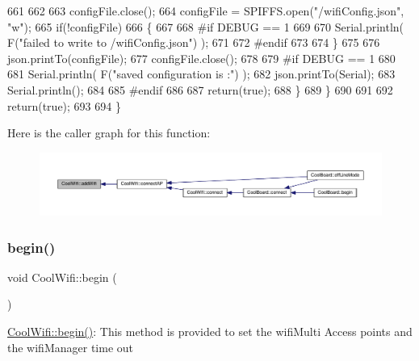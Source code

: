 \begin{DoxyCode}
661             
662 
663             configFile.close();
664             configFile = SPIFFS.open(\textcolor{stringliteral}{"/wifiConfig.json"}, \textcolor{stringliteral}{"w"});
665             \textcolor{keywordflow}{if}(!configFile)
666             \{
667             
668 \textcolor{preprocessor}{            #if DEBUG == 1 }
669 
670                 Serial.println( F(\textcolor{stringliteral}{"failed to write to /wifiConfig.json"}) );
671             
672 \textcolor{preprocessor}{            #endif}
673 
674             \}
675             
676             json.printTo(configFile);
677             configFile.close();
678 
679 \textcolor{preprocessor}{        #if DEBUG == 1 }
680 
681             Serial.println( F(\textcolor{stringliteral}{"saved configuration is :"}) );
682             json.printTo(Serial);
683             Serial.println();
684         
685 \textcolor{preprocessor}{        #endif}
686 
687             \textcolor{keywordflow}{return}(\textcolor{keyword}{true}); 
688         \}
689     \}   
690 
691     
692     \textcolor{keywordflow}{return}(\textcolor{keyword}{true});
693     
694 \}
\end{DoxyCode}
Here is the caller graph for this function\+:
\nopagebreak
\begin{figure}[H]
\begin{center}
\leavevmode
\includegraphics[width=350pt]{classCoolWifi_a914d7a1df14dd6b75345fb614c34e9d6_icgraph}
\end{center}
\end{figure}
\mbox{\label{classCoolWifi_a46942fed90e475112cc10b78a32e7aaa}} 
\subsubsection{\texorpdfstring{begin()}{begin()}}
{\footnotesize\ttfamily void Cool\+Wifi\+::begin (\begin{DoxyParamCaption}{ }\end{DoxyParamCaption})}

\hyperlink{classCoolWifi_a46942fed90e475112cc10b78a32e7aaa}{Cool\+Wifi\+::begin()}\+: This method is provided to set the wifi\+Multi Access points and the wifi\+Manager time out 

